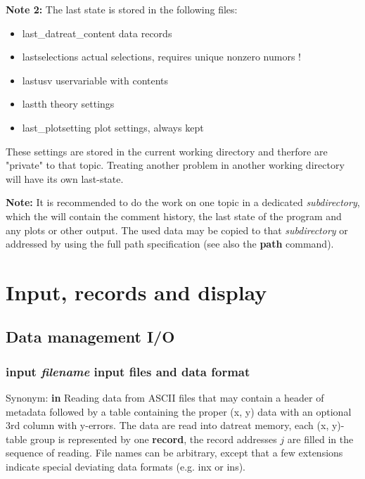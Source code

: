 \documentclass[11pt,fleqn]{book} %
\newcommand{\linespace}{\vspace{4ex}}
\newcommand{\var}[1]{{\color{red} \bf \it #1}}
\newcommand{\desc}[1]{\hskip 0.5cm {\color{descgray} #1}}
\newcommand{\expl}[1]{\hskip 0.5cm {\color{explgray} #1}}
\begin{document}
\linespace

{\bf Note 2:}
The last state is stored in the following files:
\begin{itemize}
    \item last\_datreat\_content \expl{data records}
    \item lastselections \expl{actual selections, requires unique nonzero numors !}
    \item lastusv \expl{uservariable with contents}
    \item lastth \expl{theory settings}
    \item last\_plotsetting \expl{plot settings, always kept}
\end{itemize}
These settings are stored in the current working directory and therfore are "private" to that topic. Treating another problem in another working directory will have its own last-state.

\linespace

{\bf Note:} It is recommended to do the work on one topic in a dedicated \emph{subdirectory},
which the will contain the comment history, the last state of the program and any plots or
other output. The used data may be copied to that \emph{subdirectory} or addressed by using
the full path specification (see also the {\bf path} command).


\part{Input, records and display}

\chapter{Data management I/O}
\section{input \var{filename} \desc{input files and data format}}
Synonym: {\bf in}
\linespace
Reading data from ASCII files that may contain a header of metadata followed by a table containing the
proper (x, y) data with an optional 3rd column with y-errors. The data are read into datreat memory, each
(x, y)-table group is represented by one {\bf record}, the record addresses $j$ are filled in the sequence
of reading. File names can be arbitrary, except that a few extensions indicate special deviating data formats 
(e.g. inx or ins). 
 
\end{document}
